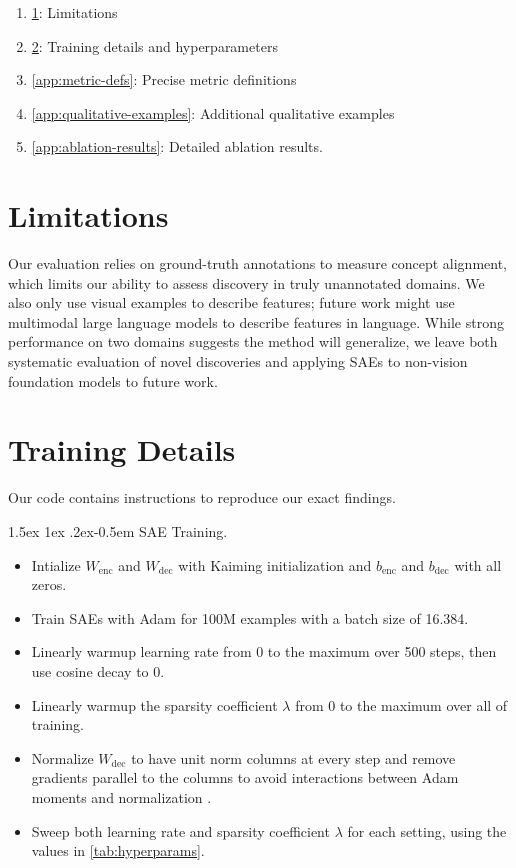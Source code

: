 \documentclass[10pt,twocolumn,letterpaper]{article}
\makeatletter
\renewcommand{\paragraph}{%
  \@startsection{paragraph}{4}%
  {\z@}{1.5ex \@plus 1ex \@minus .2ex}{-0.5em}%
  {\normalfont\normalsize\bfseries}%
}
\makeatother
\begin{document}
\begin{enumerate}[nosep]
    \item{\cref{app:limitations}: Limitations}
    \item{\cref{app:hyperparameters}: Training details and hyperparameters}
    \item{\cref{app:metric-defs}: Precise metric definitions}
    \item{\cref{app:qualitative-examples}: Additional qualitative examples}
    \item{\cref{app:ablation-results}: Detailed ablation results.}
\end{enumerate}

\section{Limitations}\label{app:limitations}
Our evaluation relies on ground-truth annotations to measure concept alignment, which limits our ability to assess discovery in truly unannotated domains. 
We also only use visual examples to describe features; future work might use multimodal large language models to describe features in language.
While strong performance on two domains suggests the method will generalize, we leave both systematic evaluation of novel discoveries and applying SAEs to non-vision foundation models to future work.


\section{Training Details}\label{app:hyperparameters}

Our code contains instructions to reproduce our exact findings.

\paragraph{SAE Training.}
\begin{itemize}
    \item{Intialize $W_\text{enc}$ and $W_\text{dec}$ with Kaiming initialization \citep{kaiming2015init} and $b_\text{enc}$ and $b_\text{dec}$ with all zeros.}
    \item{Train SAEs with Adam \citep{kingma2014adam} for \num{100}M examples with a batch size of \num{16,384}.}
    \item{Linearly warmup learning rate from \num{0} to the maximum over 500 steps, then use cosine decay to \num{0}.}
    \item{Linearly warmup the sparsity coefficient $\lambda$ from 0 to the maximum over all of training.}
    \item{Normalize $W_\text{dec}$ to have unit norm columns at every step and remove gradients parallel to the columns to avoid interactions between Adam moments and normalization \citep{bricken2023monosemanticity}.}
    \item{Sweep both learning rate and sparsity coefficient $\lambda$ for each setting, using the values in \cref{tab:hyperparams}.}
\end{itemize}
\end{document}
